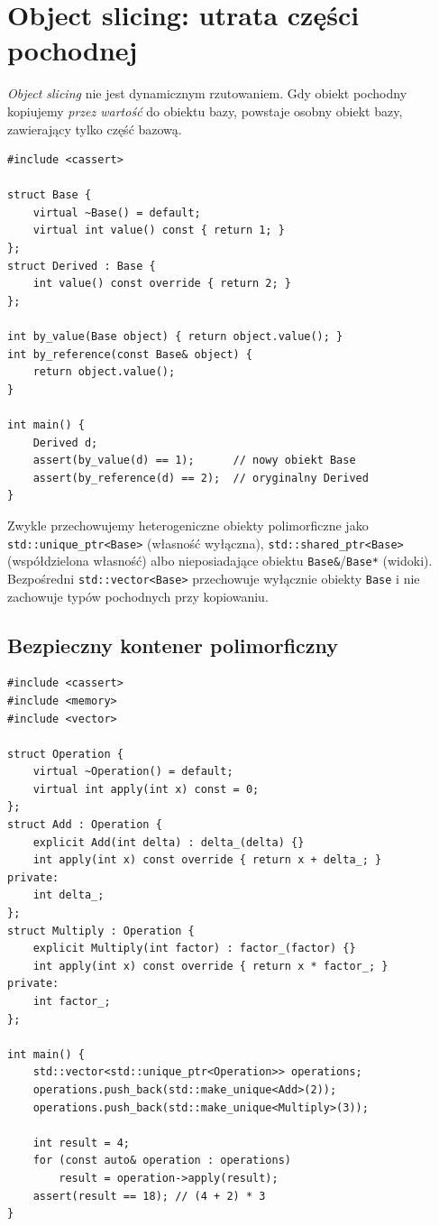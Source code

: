 \section{Object slicing: utrata części pochodnej}
\label{sec:cpp12-slicing}

\emph{Object slicing} nie jest dynamicznym rzutowaniem. Gdy obiekt
pochodny kopiujemy \emph{przez wartość} do obiektu bazy,
powstaje osobny obiekt bazy, zawierający tylko część bazową.

\begin{lstlisting}[caption={Kopiowanie przez wartość powoduje slicing (C++11); kompletny program.}]
#include <cassert>

struct Base {
    virtual ~Base() = default;
    virtual int value() const { return 1; }
};
struct Derived : Base {
    int value() const override { return 2; }
};

int by_value(Base object) { return object.value(); }
int by_reference(const Base& object) {
    return object.value();
}

int main() {
    Derived d;
    assert(by_value(d) == 1);      // nowy obiekt Base
    assert(by_reference(d) == 2);  // oryginalny Derived
}
\end{lstlisting}

Zwykle przechowujemy heterogeniczne obiekty polimorficzne
jako \texttt{std::unique\_ptr<Base>} (własność wyłączna),
\texttt{std::shared\_ptr<Base>} (współdzielona własność) albo
nieposiadające obiektu \texttt{Base\&}/\texttt{Base*} (widoki).
Bezpośredni \texttt{std::vector<Base>} przechowuje wyłącznie obiekty
\texttt{Base} i nie zachowuje typów pochodnych przy kopiowaniu.

\subsection{Bezpieczny kontener polimorficzny}

\begin{lstlisting}[caption={Własność obiektów pochodnych w kontenerze unikalnych wskaźników (C++14); kompletny program.}]
#include <cassert>
#include <memory>
#include <vector>

struct Operation {
    virtual ~Operation() = default;
    virtual int apply(int x) const = 0;
};
struct Add : Operation {
    explicit Add(int delta) : delta_(delta) {}
    int apply(int x) const override { return x + delta_; }
private:
    int delta_;
};
struct Multiply : Operation {
    explicit Multiply(int factor) : factor_(factor) {}
    int apply(int x) const override { return x * factor_; }
private:
    int factor_;
};

int main() {
    std::vector<std::unique_ptr<Operation>> operations;
    operations.push_back(std::make_unique<Add>(2));
    operations.push_back(std::make_unique<Multiply>(3));

    int result = 4;
    for (const auto& operation : operations)
        result = operation->apply(result);
    assert(result == 18); // (4 + 2) * 3
}
\end{lstlisting}


